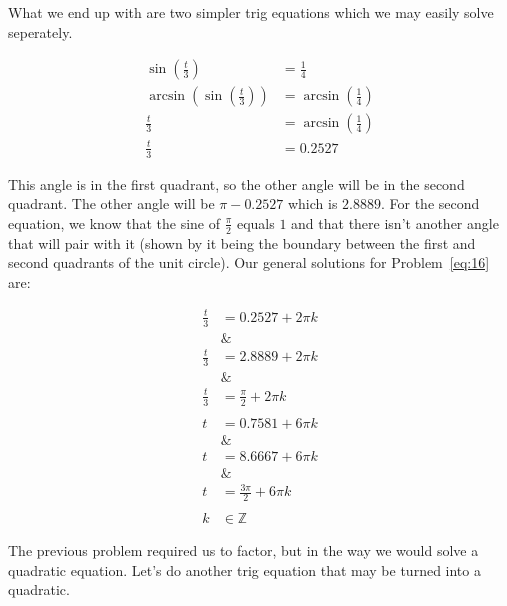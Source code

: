 \documentclass[12pt]{article}
\theoremstyle{definition}
\begin{document}
What we end up with are two simpler trig equations which we may easily solve seperately.

\begin{align}
    \sin\left(\frac{t}{3}\right)                     & = \frac{1}{4}                     \\
    \arcsin\left(\sin\left(\frac{t}{3}\right)\right) & = \arcsin\left(\frac{1}{4}\right) \\
    \frac{t}{3}                                      & = \arcsin\left(\frac{1}{4}\right) \\
    \frac{t}{3}                                      & = 0.2527
\end{align}

This angle is in the first quadrant, so the other angle will be in the second quadrant.
The other angle will be $\pi-0.2527$ which is $2.8889$.
For the second equation, we know that the sine of $\frac{\pi}{2}$ equals $1$ and that there isn't another angle that will pair with it (shown by it being the boundary between the first and second quadrants of the unit circle).
Our general solutions for Problem~\eqref{eq:16} are:

\begin{align}
    \frac{t}{3} & = 0.2527 + 2\pi k         \\
    \nonumber   & \&                        \\
    \frac{t}{3} & = 2.8889 + 2\pi k         \\
    \nonumber   & \&                        \\
    \frac{t}{3} & = \frac{\pi}{2} + 2\pi k  \\
    \nonumber                               \\
    t           & = 0.7581 + 6\pi k         \\
    \nonumber   & \&                        \\
    t           & = 8.6667 + 6\pi k         \\
    \nonumber   & \&                        \\
    t           & = \frac{3\pi}{2} + 6\pi k \\
    \nonumber                               \\
    k           & \in \mathbb{Z}
\end{align}

The previous problem required us to factor, but in the way we would solve a quadratic equation.
Let's do another trig equation that may be turned into a quadratic.
\end{document}
